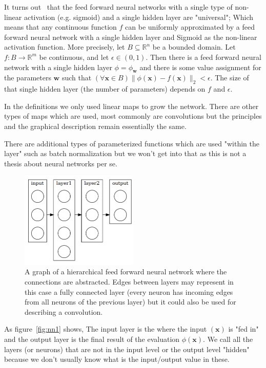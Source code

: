 \documentclass[11pt, a4paper]{report}
\theoremstyle{plain}
\theoremstyle{definition}
\theoremstyle{remark}
\newcommand{\R}{\mathbb{R}}
\newcommand{\x}{\mathbf{x}}
\newcommand{\w}{\mathbf{w}}
\newcommand{\lt}{<}
\begin{document}
It turns out~\cite{nielsen2015neural} that the feed forward neural networks with
a single type of non-linear activation (e.g. sigmoid) and a single hidden layer
are "universal"; Which means that any continuous function $f$ can be uniformly
approximated by a feed forward neural network with a single hidden layer and
Sigmoid as the non-linear activation function. More precisely, let $B \subseteq
\R^n$ be a bounded domain. Let $f : B \to \R^m$ be continuous, and let $\epsilon
\in (0,1)$. Then there is a feed forward neural network with a single hidden
layer $\phi = \phi_{\w}$ and there is some value assignment for the parameters
$\w$ such that $(\forall \x \in B) \|\phi(\x) - f(\x)\|_2 \lt \epsilon $. The
size of that single hidden layer (the number of parameters) depends on $f$ and
$\epsilon$.

In the definitions we only used linear maps to grow the network. There are other
types of maps which are used, most commonly are convolutions but the principles
and the graphical description remain essentially the same.

There are additional types of parameterized functions which are used "within the
layer" such as batch normalization but we won't get into that as this is not a
thesis about neural networks per se.

\begin{figure}[h]
\centering
\includegraphics[width=0.5\textwidth]{./plots/multilayer.gv.png}
\caption{
A graph of a hierarchical feed forward neural network where the connections 
are abstracted. Edges between layers may represent in this case a fully
connected layer (every neuron has incoming edges from all neurons of the
previous layer) but it could also be used for describing a convolution.
}
\label{fig:nn2}
\end{figure}

As figure~\ref{fig:nn1} shows, 
The input layer is the where the input $(\x)$ is "fed in" and the output layer
is the final result of the evaluation $\phi(\x)$.
We call all the layers (or neurons) that are 
not in the input level or the output level "hidden"
because we don't usually know what is the input/output value in these.
\end{document}
